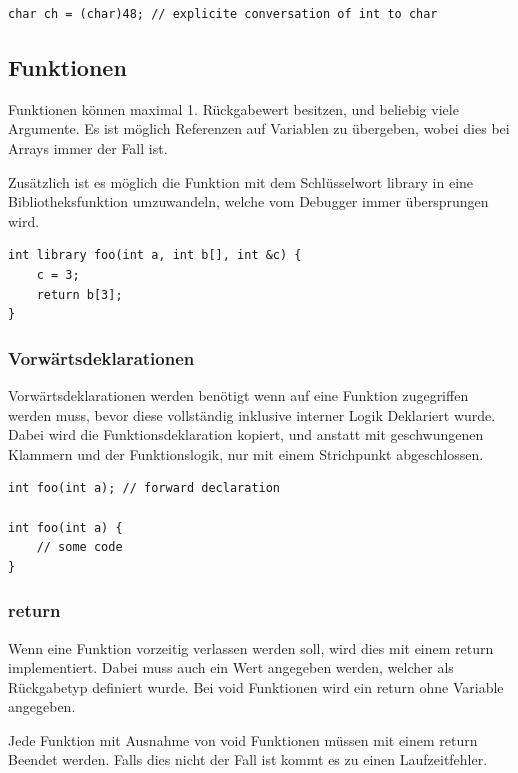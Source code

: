 \begin{lstlisting}[language=CMM]
char ch = (char)48; // explicite conversation of int to char
\end{lstlisting}

\subsection{Funktionen}

Funktionen k\"onnen maximal 1. R\"uckgabewert besitzen, und beliebig viele Argumente. Es ist m\"oglich Referenzen auf Variablen zu \"ubergeben, wobei dies bei Arrays immer der Fall ist.

Zus\"atzlich ist es m\"oglich die Funktion mit dem Schl\"usselwort library in eine Bibliotheksfunktion umzuwandeln, welche vom Debugger immer \"ubersprungen wird.

\begin{lstlisting}[language=CMM]
int library foo(int a, int b[], int &c) {
	c = 3;
	return b[3];
}
\end{lstlisting}

\subsubsection{Vorw\"artsdeklarationen}

Vorw\"artsdeklarationen werden ben\"otigt wenn auf eine Funktion zugegriffen werden muss, bevor diese vollst\"andig inklusive interner Logik Deklariert wurde. Dabei wird die Funktionsdeklaration kopiert, und anstatt mit geschwungenen Klammern und der Funktionslogik, nur mit einem Strichpunkt abgeschlossen.

\begin{lstlisting}[language=CMM]
int foo(int a); // forward declaration

int foo(int a) {
	// some code
}
\end{lstlisting}

\subsubsection{return}

Wenn eine Funktion vorzeitig verlassen werden soll, wird dies mit einem return implementiert. Dabei muss auch ein Wert angegeben werden, welcher als R\"uckgabetyp definiert wurde. Bei void Funktionen wird ein return ohne Variable angegeben.

Jede Funktion mit Ausnahme von void Funktionen m\"ussen mit einem return Beendet werden. Falls dies nicht der Fall ist kommt es zu einen Laufzeitfehler.

